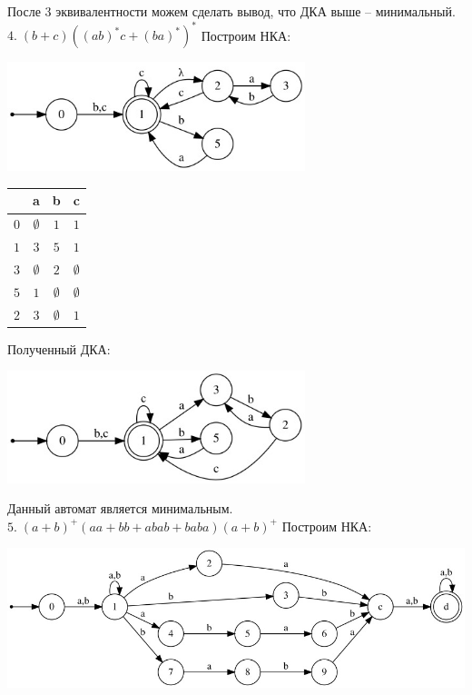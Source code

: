 \documentclass[a4paper,12pt]{article}
\begin{document}
После 3 эквивалентности можем сделать вывод, что ДКА выше -- минимальный.\newline
\Large $4.\;(b+c)((ab)^*c+(ba)^*)^*$\newline
Построим НКА:
\begin{center}
\includegraphics[width=0.65\textwidth]{3_4_nka}\newline
\end{center}
\begin{center}
\begin{tabular}{ |c|c|c|c| } 
\hline
  & a & b & c \\ [0.5ex] 
 \hline
$0$ & $\emptyset$ & $1$ & $1$ \\
$1$ & $3$ & $5$ & $1$ \\
$3$ & $\emptyset$ & $2$ & $\emptyset$ \\
$5$ & $1$ & $\emptyset$ & $\emptyset$ \\
$2$ & $3$ & $\emptyset$ & $1$ \\
 \hline
\end{tabular}
\end{center}
Полученный ДКА:
\begin{center}
\includegraphics[width=0.65\textwidth]{3_4}\newline
\end{center}
Данный автомат является минимальным.\newline
\Large $5.\;(a+b)^+(aa+bb+abab+baba)(a+b)^+$\newline
Построим НКА:
\begin{center}
\includegraphics[width=1\textwidth]{3_5_nka}\newline
\end{center}
\end{document}
